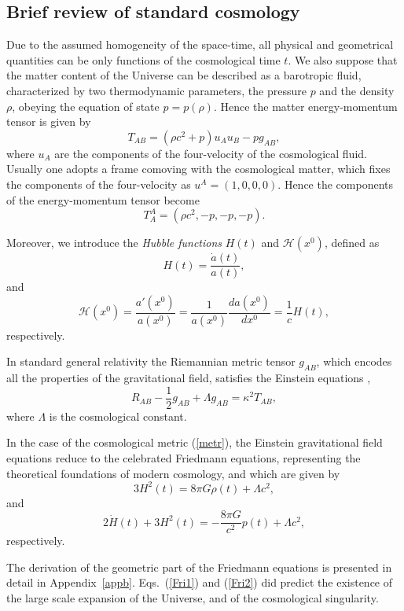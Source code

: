 \documentclass[aps,superscriptaddress, showpacs,preprintnumbers, superscriptaddress, nofootinbibt,twocolumn]{revtex4-2}
\def\be{\begin{equation}}
\def\ee{\end{equation}}
\begin{document}
\subsection{Brief review of standard cosmology}

Due to the assumed homogeneity of the space-time, all physical and
geometrical quantities can be only functions of the cosmological time $t$.
We also suppose that the matter content of the Universe can be described as
a barotropic fluid, characterized by two thermodynamic parameters, the
pressure $p$ and the density $\rho $, obeying the equation of state $%
p=p(\rho )$. Hence the matter energy-momentum tensor is given by
\be
T_{AB}=\left( \rho c^{2}+p\right) u_{A}u_{B}-pg_{AB},
\ee
where $u_{A}$ are the
components of the four-velocity of the cosmological fluid. Usually one
adopts a frame comoving with the cosmological matter, which fixes the
components of the four-velocity as $u^{A}=\left( 1,0,0,0\right) $. Hence the
components of the energy-momentum tensor become
\be
T_{A}^{A}=\left( \rho c^2,-p,-p,-p\right) .
\ee

 Moreover, we introduce the {\it Hubble functions} $H(t)$ and $\mathcal{H}\left(x^0\right)$, defined as
 \be
 H(t)=\frac{\dot{a}(t)}{a(t)},
 \ee
 and
 \be
 \mathcal{H}\left(x^0\right)=\frac{a'\left(x^0\right)}{a\left(x^0\right)}=\frac{1}{a\left(x^0\right)}\frac{da\left(x^0\right)}{dx^0}=\frac{1}{c}H(t),
 \ee
 respectively.

In standard general relativity the Riemannian metric tensor $g_{AB}$, which
encodes all the properties of the gravitational field, satisfies the
Einstein equations \cite{e8, Land},
\begin{equation}
R_{AB}-\frac{1}{2}g_{AB}+\Lambda g_{AB}=\kappa ^2T_{AB},
\end{equation}%
where $\Lambda$ is the cosmological constant.

In the case of the cosmological metric (\ref{metr}), the Einstein
gravitational field equations reduce to the celebrated Friedmann equations, representing the theoretical foundations of modern cosmology, and which are
given by \cite{e8}
\begin{equation}
3H^2(t)=8\pi G \rho (t)+\Lambda c^2,  \label{Fri1}
\end{equation}
and%
\begin{equation}
2\dot{H}(t)+3H^2(t)=-\frac{8\pi G}{c^2}p(t)+\Lambda c^2, \label{Fri2}
\end{equation}
respectively.

The derivation of the geometric part of the Friedmann equations is presented
in detail in Appendix~\ref{appb}. Eqs.~(\ref{Fri1}) and (\ref{Fri2}) did
predict the existence of the large scale expansion of the Universe, and of
the cosmological singularity.
\end{document}

